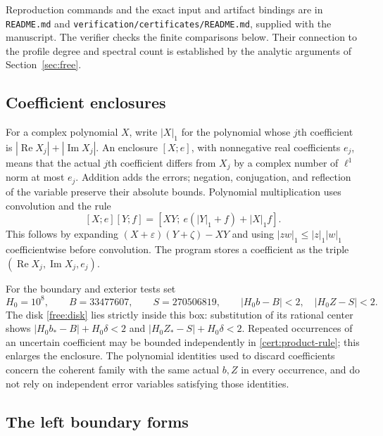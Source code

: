 \documentclass[11pt]{article}
\numberwithin{equation}{section}
\theoremstyle{definition}
\theoremstyle{remark}
\begin{document}
Reproduction commands and the exact input and artifact bindings are in
\texttt{README.md} and
\texttt{verification/}\allowbreak\texttt{certificates/}\allowbreak\texttt{README.md}, supplied with the
manuscript. The verifier checks the finite comparisons below. Their
connection to the profile degree and spectral count is established by
the analytic arguments of Section~\ref{sec:free}.

\subsection{Coefficient enclosures}

For a complex polynomial $X$, write $|X|_1$ for the polynomial whose
$j$th coefficient is $|\operatorname{Re}X_j|+|\operatorname{Im}X_j|$.
An enclosure $[X;e]$, with nonnegative real coefficients $e_j$, means
that the actual $j$th coefficient differs from $X_j$ by a complex number
of $\ell^1$ norm at most $e_j$.  Addition adds the errors; negation,
conjugation, and reflection of the variable preserve their absolute
bounds.  Polynomial multiplication uses convolution and the rule
\begin{equation}\label{cert:product-rule}
 [X;e][Y;f]=[XY;\ e(|Y|_1+f)+|X|_1f].
\end{equation}
This follows by expanding $(X+\varepsilon)(Y+\zeta)-XY$ and using
$|zw|_1\le|z|_1|w|_1$ coefficientwise before convolution.
The program stores a coefficient as the triple
$(\operatorname{Re}X_j,\operatorname{Im}X_j,e_j)$.

For the boundary and exterior tests set
\begin{equation}\label{cert:integer-box}
 H_0=10^8,\qquad B=33477607,\qquad S=270506819,
 \qquad |H_0b-B|<2,\quad |H_0Z-S|<2.
\end{equation}
The disk \eqref{free:disk} lies strictly inside this box: substitution of
its rational center shows
$|H_0b_*-B|+H_0\delta<2$ and
$|H_0Z_*-S|+H_0\delta<2$.  Repeated occurrences of an uncertain
coefficient may be bounded independently in
\eqref{cert:product-rule}; this enlarges the enclosure.  The polynomial
identities used to discard coefficients concern the coherent family
with the same actual $b,Z$ in every occurrence, and do not rely on
independent error variables satisfying those identities.

\subsection{The left boundary forms}\label{cert:boundary}
\end{document}
